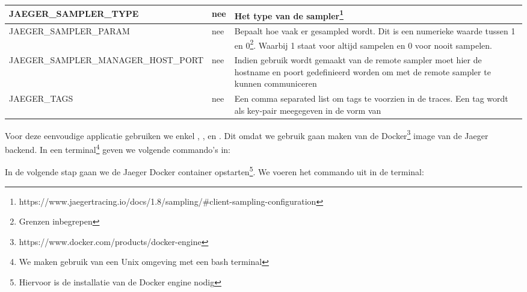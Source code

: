 \begin{table}
\begin{center}
{\begin{tabular}{| l | l | p{5cm} |}
				JAEGER\_SAMPLER\_TYPE & nee & Het type van de sampler\footnote{https://www.jaegertracing.io/docs/1.8/sampling/\#client-sampling-configuration} \\ \hline
				JAEGER\_SAMPLER\_PARAM & nee & Bepaalt hoe vaak er gesampled wordt. Dit is een numerieke waarde tussen 1 en 0\footnote{Grenzen inbegrepen}. Waarbij 1 staat voor altijd sampelen en 0 voor nooit sampelen. \\ \hline
				JAEGER\_SAMPLER\_MANAGER\_HOST\_PORT & nee & Indien gebruik wordt gemaakt van de remote sampler moet hier de hostname en poort gedefinieerd worden om met de remote sampler te kunnen communiceren \\ \hline
				JAEGER\_TAGS & nee & Een comma separated list om tags te voorzien in de traces. Een tag wordt 	als key-pair meegegeven in de vorm van \code{tagName = value} \\ \hline
			\end{tabular}
		}
	\end{center}
\end{table}

Voor deze eenvoudige applicatie gebruiken we enkel , ,  en . Dit omdat we gebruik gaan maken van de Docker\footnote{https://www.docker.com/products/docker-engine} image van de Jaeger backend. In een terminal\footnote{We maken gebruik van een Unix omgeving met een bash terminal} geven we volgende commando's in:
\begin{list}{}{}
	\item {}
	\item {}
	\item {}
	\item {}
	\item {}
\end{list}
In de volgende stap gaan we de Jaeger Docker container opstarten\footnote{Hiervoor is de installatie van de Docker engine nodig}. We voeren het commando uit in de terminal:
\begin{list}{}{}
	\item {}
	\item {}
\end{list}